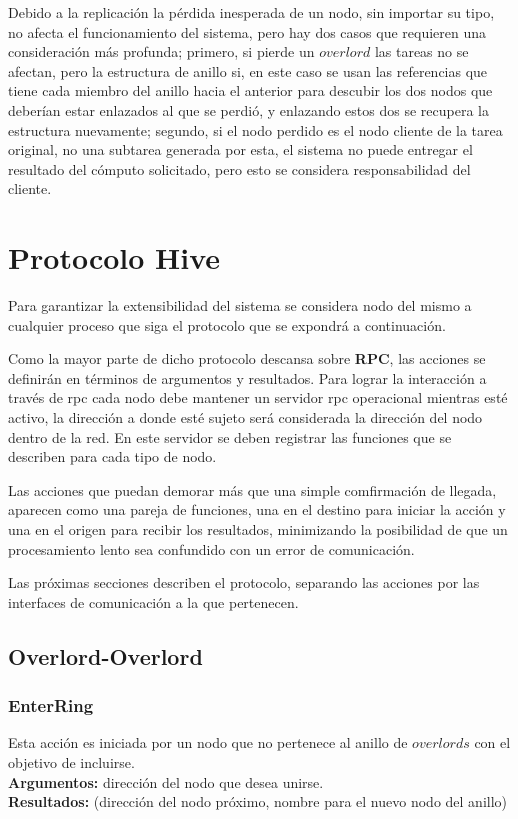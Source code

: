 \documentclass[a4paper,10pt]{article}
\begin{document}
			Debido a la replicación la pérdida inesperada de un nodo, sin importar su tipo, no afecta el funcionamiento del sistema, pero hay dos casos que requieren una consideración más profunda; primero, si pierde un $overlord$ las tareas no se afectan, pero la estructura de anillo si, en este caso se usan las referencias que tiene cada miembro del anillo hacia el anterior para descubir los dos nodos que deberían estar enlazados al que se perdió, y enlazando estos dos se recupera la estructura nuevamente; segundo, si el nodo perdido es el nodo cliente de la tarea original, no una subtarea generada por esta, el sistema no puede entregar el resultado del cómputo solicitado, pero esto se considera responsabilidad del cliente. 
	
	\section{Protocolo Hive}
	
		Para garantizar la extensibilidad del sistema se considera nodo del mismo a cualquier proceso que siga el protocolo que se expondrá a continuación.
		
		Como la mayor parte de dicho protocolo descansa sobre \textbf{RPC}\cite{rpc}, las acciones se definirán en términos de argumentos y resultados. Para lograr la interacción a través de rpc cada nodo debe mantener un servidor rpc operacional mientras esté activo, la dirección a donde esté sujeto será considerada la dirección del nodo dentro de la red. En este servidor se deben registrar las funciones que se describen para cada tipo de nodo.
		
		Las acciones que puedan demorar más que una simple comfirmación de llegada, aparecen como una pareja de funciones, una en el destino para iniciar la acción y una en el origen para recibir los resultados, minimizando la posibilidad de que un procesamiento lento sea confundido con un error de comunicación. 
		
		Las próximas secciones describen el protocolo, separando las acciones por las interfaces de comunicación a la que pertenecen.
	
	\pagebreak
	\subsection{Overlord-Overlord}
		\subsubsection{EnterRing}\label{entring}
			Esta acción es iniciada por un nodo que no pertenece al anillo de $overlords$ con el objetivo de incluirse.
			\\
			\textbf{Argumentos:} dirección del nodo que desea unirse. \\
			\textbf{Resultados:} (dirección del nodo próximo, nombre para el nuevo nodo del anillo)\\
			
\end{document}
